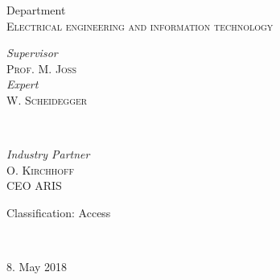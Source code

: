\begin{titlepage}
	{\normalsize Department}\\
	
	\textsc{\normalsize Electrical engineering and information technology}\\[0.3cm] %
	
	\vfill
	
	
	\begin{minipage}{0.4\textwidth}
		\begin{flushleft}
			\normalsize
			\textit{Supervisor}\\
			\textsc{Prof.} M. \textsc{Joss} %
			\vspace{4mm}\\
			\normalsize
			\textit{Expert}\\
			W. \textsc{Scheidegger} %
		\end{flushleft}
	\end{minipage}
	~
	\begin{minipage}{0.4\textwidth}
		\begin{flushright}
			\normalsize
			\textit{Industry Partner}\\
			O. \textsc{Kirchhoff}\\
			CEO ARIS
		\end{flushright}
	\end{minipage}
	
	\vspace{0.8cm}
	
	\begin{minipage}{0.4\textwidth}
		\begin{flushleft}
			{\normalsize Classification: Access}
		\end{flushleft}
	\end{minipage}
	~
	\begin{minipage}{0.4\textwidth}
		\begin{flushright}
			{\normalsize 8. May 2018} %
		\end{flushright}
	\end{minipage}
	
\end{titlepage}